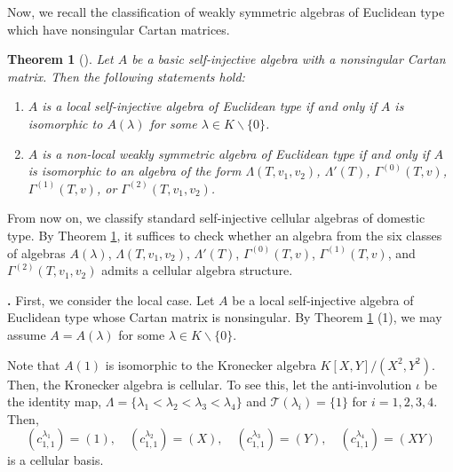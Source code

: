 \documentclass[12pt]{amsart}
\newtheorem{thm}{Theorem}[section]
\def \para{\refstepcounter{thm} \par\medskip\noindent
                \textbf{\thethm .} }
\numberwithin{equation}{thm}
\newcommand\cT{\mathcal{T}}
\newcommand\la{\lambda}
\begin{document}
Now, we recall the classification of weakly symmetric algebras of Euclidean type which have nonsingular Cartan matrices. 

 \begin{thm}[{\cite[Theorem 1,1 and Theorem 1.2]{BHS}}]\label{D thm class}
 Let $A$ be a basic self-injective algebra with a nonsingular Cartan matrix. Then the following statements hold:
 \begin{enumerate}
 \item[(1)]  $A$ is a local self-injective algebra of Euclidean type if and only if $A$ is isomorphic to $A(\lambda)$ for some $\lambda\in K\backslash \{0\}$.
 \item[(2)] $A$ is a non-local weakly symmetric algebra of Euclidean type if and only if $A$ is isomorphic to an algebra of the form $\Lambda (T,v_1,v_2)$, $\Lambda'(T)$, $\Gamma^{(0)}(T,v)$, $\Gamma^{(1)}(T,v)$, or $\Gamma^{(2)}(T,v_1,v_2)$.
 \end{enumerate}
 \end{thm}

From now on, we classify standard self-injective cellular algebras of domestic type. 
By Theorem \ref{D thm class}, 
it suffices to check whether an algebra from the six classes of algebras 
$A(\lambda)$, $\Lambda (T,v_1,v_2)$, $\Lambda'(T)$, $\Gamma^{(0)}(T,v)$, $\Gamma^{(1)}(T,v)$, and $\Gamma^{(2)}(T,v_1,v_2)$
admits a cellular algebra structure.


\para
First, we consider the local case. Let $A$ be a local self-injective algebra of Euclidean type whose Cartan matrix is nonsingular. 
By Theorem \ref{D thm class} (1), we may assume $A=A(\lambda)$ for some $\lambda \in K\backslash\{0\}$. 

Note that $A(1)$ is isomorphic to the Kronecker algebra $K[X,Y]/(X^2,Y^2)$. 
Then, the Kronecker algebra is cellular. To see this, 
let the anti-involution $\iota$ be the identity map, 
$\Lambda=\{\la_1<\la_2<\la_3<\la_4\}$ 
and $\cT(\la_i)=\{1\}$ for $i=1,2,3,4$. Then,
\[
(c^{\la_1}_{1,1})=(1),\quad (c^{\la_2}_{1,1})=(X), \quad (c^{\la_3}_{1,1})=(Y), \quad (c^{\la_4}_{1,1})=(XY)
\]
is a cellular basis.

\end{document}

